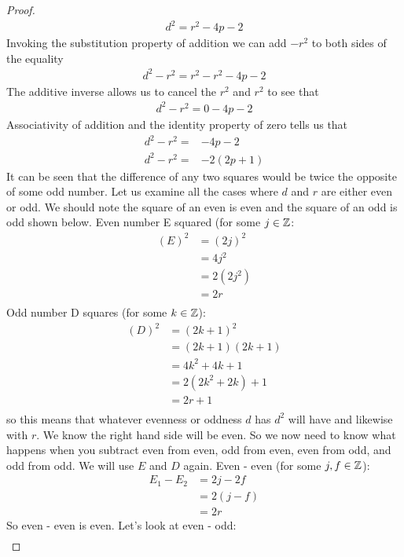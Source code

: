 \documentclass{article}
\begin{document}
\begin{proof}
\begin{align*}
    d^2 = r^2 - 4p - 2
\end{align*}
Invoking the substitution property of addition we can add $-r^2$ to both sides of the equality
\begin{align*}
    d^2 - r^2 = r^2 - r^2 - 4p - 2
\end{align*}
The additive inverse allows us to cancel the $r^2$ and $r^2$ to see that 
\begin{align*}
    d^2 - r^2 = 0 - 4p - 2
\end{align*}
Associativity of addition and the identity property of zero tells us that 
\begin{align*}
    d^2 - r^2 =& -4p - 2\\
    d^2 - r^2 =& -2(2p+1)
\end{align*}
It can be seen that the difference of any two squares would be twice the opposite of some odd number. Let us examine all the cases where $d$ and $r$ are either even or odd. We should note the square of an even is even and the square of an odd is odd shown below. Even number E squared (for some $j \in \Bbb{Z}$:
\begin{align*}
    (E)^2 &= (2j)^2\\
    &= 4j^2\\
    &= 2(2j^2)\\
    &=2r\\
\end{align*}
Odd number D squares (for some $k \in \Bbb{Z}$):
\begin{align*}
    (D)^2 &= (2k+1)^2\\
    &= (2k+1)(2k+1)\\
    &= 4k^2 + 4k + 1\\
    &= 2(2k^2 + 2k) + 1\\
    &= 2r + 1\\
\end{align*}
so this means that whatever evenness or oddness $d$ has $d^2$ will have and likewise with $r$. We know the right hand side will be even. So we now need to know what happens when you subtract even from even, odd from even, even from odd, and odd from odd. We will use $E$ and $D$ again. Even - even (for some $j,f \in \Bbb{Z}$):
\begin{align*}
    E_1 - E_2 &= 2j - 2f\\
    &= 2(j-f)\\
    &= 2r
\end{align*}
So even - even is even. Let's look at even - odd:
\begin{align*}

\end{align*}
\end{proof}
\end{document}
